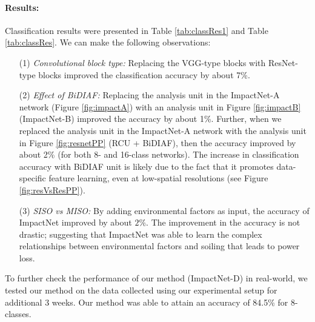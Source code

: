 \documentclass[10pt,twocolumn,letterpaper]{article}
\begin{document}
\vspace{-4mm}
\paragraph{Results:} Classification results were presented in Table \ref{tab:classRes1} and Table \ref{tab:classRes}. We can make the following observations:
\begin{itemize}[itemsep=0pt]
\item[{(1)}] \textit{Convolutional block type:} Replacing the VGG-type blocks with ResNet-type blocks improved the classification accuracy by about 7\%. 
\item[{(2)}] \textit{Effect of BiDIAF:} Replacing the analysis unit in the ImpactNet-A network (Figure \ref{fig:impactA}) with an analysis unit in Figure \ref{fig:impactB} (ImpactNet-B) improved the accuracy by about 1\%. Further, when we replaced the analysis unit in the ImpactNet-A network with the analysis unit in Figure \ref{fig:resnetPP} (RCU + BiDIAF), then the accuracy improved by about 2\% (for both 8- and 16-class networks). The increase in classification accuracy with BiDIAF unit is likely due to the fact that it promotes data-specific feature learning, even at low-spatial resolutions (see Figure \ref{fig:resVsResPP}).
\item[{(3)}] \textit{SISO vs MISO:} By adding environmental factors as input, the accuracy of ImpactNet improved by about $2\%$. The improvement in the accuracy is not drastic; suggesting that ImpactNet was able to learn the complex relationships between environmental factors and soiling that leads to power loss.
\end{itemize}
To further check the performance of our method (ImpactNet-D) in real-world, we tested our method on the data collected using our experimental setup for additional 3 weeks. Our method was able to attain an accuracy of 84.5\% for 8-classes.

\begin{table}[b!]
\centering
{}
\setlength{\belowcaptionskip}{-2mm}
\caption{This table compares the top-1 accuracies of different types of convolutional blocks on our dataset (for 8 classes). VGG-type block is the same as ResNet-type block (Figure \ref{fig:impactA}), except the skip connection.}
\label{tab:classRes1}
\end{table}
\end{document}
